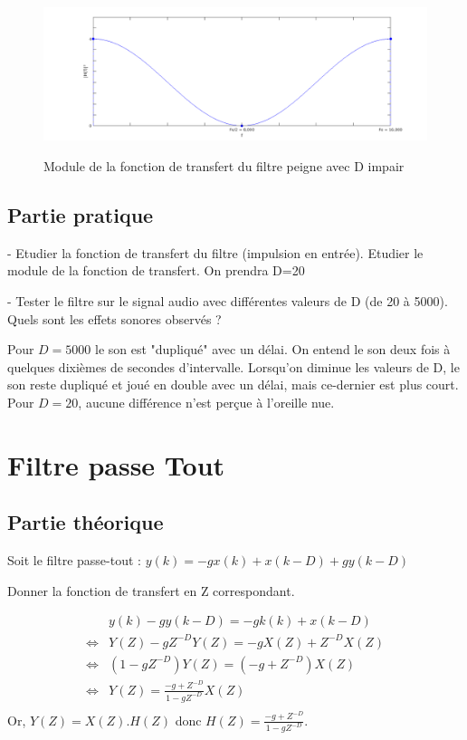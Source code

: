\begin{figure}[!ht]
		\begin{center}
			\includegraphics[width=1\textwidth]{img/modulePeigneDimpairFull}
			\label{fig:modulePeigneDimpair}
			\caption{Module de la fonction de transfert du filtre peigne avec D impair}
		\end{center}
\end{figure}

\clearpage

\subsection{Partie pratique}

- Etudier la fonction de transfert du filtre (impulsion en entrée). Etudier le module de la fonction de transfert. On prendra D=20

- Tester le filtre sur le signal audio avec différentes valeurs de D (de 20 à 5000). Quels sont les effets sonores observés ?

Pour $D = 5000$ le son est "dupliqué" avec un délai. On entend le son deux fois à quelques dixièmes de secondes d'intervalle. Lorsqu'on diminue les valeurs de D, le son reste dupliqué et joué en double avec un délai, mais ce-dernier est plus court. Pour $D = 20$, aucune différence n'est perçue à l'oreille nue.

\section{Filtre passe Tout}

\subsection{Partie théorique}

Soit le filtre passe-tout : $y(k) = −gx(k) + x(k − D) + gy(k − D)$

Donner la fonction de transfert en Z correspondant.

\begin{align*}
  &y(k) - gy(k - D) = -gk(k) + x(k - D)\\
  \iff &Y(Z) - gZ^{-D}Y(Z) = -gX(Z) + Z^{-D}X(Z)\\
  \iff &(1 - gZ^{-D})Y(Z) = (-g + Z^{-D})X(Z)\\
  \iff &Y(Z) = \frac{-g + Z^{-D}}{1 - gZ^{-D}}X(Z)\\
\end{align*}
Or, $Y(Z) = X(Z).H(Z)$ donc $H(Z) = \frac{-g + Z^{-D}}{1 - gZ^{-D}}$.\\

